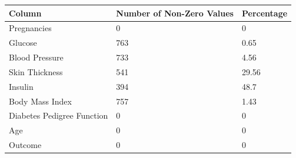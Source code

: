 \documentclass[12pt]{article}
\begin{document}
{
\clearpage
\begin{landscape}
\centering
\begin{table}[]
\centering
\begin{tabular}{|l|l|l|}
\hline
Column                     & Number of Non-Zero Values & Percentage \\ \hline
Pregnancies                & 0                         & 0          \\ \hline
Glucose                    & 763                       & 0.65       \\ \hline
Blood Pressure             & 733                       & 4.56       \\ \hline
Skin Thickness             & 541                       & 29.56      \\ \hline
Insulin                    & 394                       & 48.7       \\ \hline
Body Mass Index            & 757                       & 1.43       \\ \hline
Diabetes Pedigree Function & 0                         & 0          \\ \hline
Age                        & 0                         & 0          \\ \hline
Outcome                    & 0                         & 0          \\ \hline
\end{tabular}
\end{table}
\label{table:4}
\end{landscape}
\clearpage
}
\end{document}
